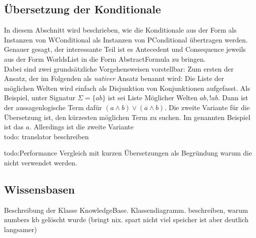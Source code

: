 \documentclass[12pt,a4paper]{article}
\begin{document}
\subsection{Übersetzung der Konditionale}
\label{sec:übersetzung}
In diesem Abschnitt wird beschrieben, wie die Konditionale aus der Form als Instanzen von WConditional als Instanzen von PConditional übertragen werden. Genauer gesagt, der interessante Teil ist es Antecedent und Consequence jeweils aus der Form WorldsList in die Form AbstractFormula zu bringen. \\
Dabei sind zwei grundsätzliche Vorgehensweisen vorstellbar: Zum ersten der Ansatz, der im Folgenden als \textit{nativer} Ansatz benannt wird: Die Liste der möglichen Welten wird einfach als Disjunktion von Konjunktionen aufgefasst. Als Beispiel, unter Signatur $\Sigma=\{ab\}$ ist sei Liste Möglicher Welten $ab, !ab$. Dann ist der aussagenlogische Term dafür $(a \wedge b) \vee (\overline{a}\wedge b)$. Die zweite Variante für die Übersetzung ist, den kürzesten möglichen Term zu suchen. Im genannten Beispiel ist das $a$. Allerdings ist die zweite Variante
\\
todo: translator beschreiben

todo:Performance Vergleich mit kurzen Übersetzungen als Begründung warum die nicht verwendet werden.
\subsection{Wissensbasen}
Beschreibung der Klasse KnowledgeBase. Klassendiagramm.
beschreiben, warum numbers kb gelöscht wurde (bringt nix. spart nicht viel speicher ist aber deutlich langsamer)
\end{document}
